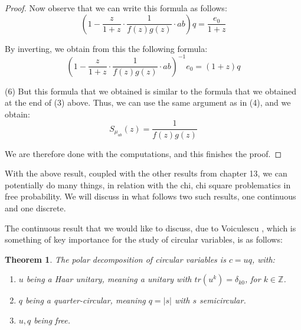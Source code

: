 \documentclass[12pt]{amsbook}
\newtheorem{theorem}{Theorem}[chapter]
\begin{document}
\begin{proof}
Now observe that we can write this formula as follows:
$$\left(1-\frac{z}{1+z}\cdot\frac{1}{f(z)g(z)}\cdot ab\right)q=\frac{e_0}{1+z}$$

By inverting, we obtain from this the following formula:
$$\left(1-\frac{z}{1+z}\cdot\frac{1}{f(z)g(z)}\cdot ab\right)^{-1}e_0=(1+z)q$$

(6) But this formula that we obtained is similar to the formula that we obtained at the end of (3) above. Thus, we can use the same argument as in (4), and we obtain:
$$S_{\mu_{ab}}(z)=\frac{1}{f(z)g(z)}$$

We are therefore done with the computations, and this finishes the proof.
\end{proof}

With the above result, coupled with the other results from chapter 13, we can potentially do many things, in relation with the chi, chi square problematics in free probability. We will discuss in what follows two such results, one continuous and one discrete. 

\bigskip

The continuous result that we would like to discuss, due to Voiculescu \cite{vo3}, which is something of key importance for the study of circular variables, is as follows:

\begin{theorem}
The polar decomposition of circular variables is $c=uq$, with:
\begin{enumerate}
\item $u$ being a Haar unitary, meaning a unitary with $tr(u^k)=\delta_{k0}$, for $k\in\mathbb Z$.

\item $q$ being a quarter-circular, meaning $q=|s|$ with $s$ semicircular.

\item $u,q$ being free.
\end{enumerate}
\end{theorem}
\end{document}
